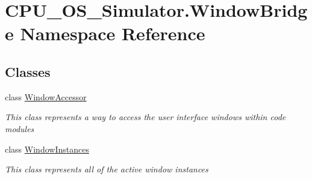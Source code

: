 \hypertarget{namespace_c_p_u___o_s___simulator_1_1_window_bridge}{}\section{C\+P\+U\+\_\+\+O\+S\+\_\+\+Simulator.\+Window\+Bridge Namespace Reference}
\label{namespace_c_p_u___o_s___simulator_1_1_window_bridge}
\subsection*{Classes}
\begin{DoxyCompactItemize}
\item 
class \hyperlink{class_c_p_u___o_s___simulator_1_1_window_bridge_1_1_window_accessor}{Window\+Accessor}
\begin{DoxyCompactList}\small\item\em This class represents a way to access the user interface windows within code modules \end{DoxyCompactList}\item 
class \hyperlink{class_c_p_u___o_s___simulator_1_1_window_bridge_1_1_window_instances}{Window\+Instances}
\begin{DoxyCompactList}\small\item\em This class represents all of the active window instances \end{DoxyCompactList}\end{DoxyCompactItemize}
